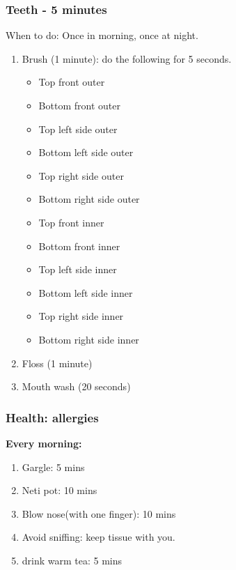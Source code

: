 \begin{frame}[label=routinesBrush]
\frametitle{Teeth - 5  minutes}
           {\small When to do: Once in morning, once at night.\\}
           \begin{enumerate} 
             \small \item \small Brush (1 minute): do the following for 5 seconds.             
             \begin{itemize}
               \tiny \item \tiny Top front outer
             \item \tiny Bottom front outer
             \item \tiny Top left side outer 
             \item \tiny Bottom left side outer
             \item \tiny Top right side outer
             \item \tiny Bottom right side outer
               \tiny \item Top front inner
             \item \tiny Bottom front inner
             \item \tiny Top left side inner
             \item \tiny Bottom left side inner
             \item \tiny Top right side inner
             \item \tiny Bottom right side inner
             \end{itemize} 
           \item \small Floss (1 minute) 
           \item \small Mouth wash (20 seconds)
           \end{enumerate} 
\end{frame}

\begin{frame}
\frametitle{Health: allergies}
\textbf{Every morning:}
\begin{enumerate}
\small \item \small Gargle: 5 mins 
\item \small Neti pot: 10 mins 
\item \small Blow nose(with one finger): 10 mins 
\item \small Avoid sniffing: keep tissue with you. 
\item \small drink warm tea: 5 mins
\end{enumerate} 
\end{frame} 

